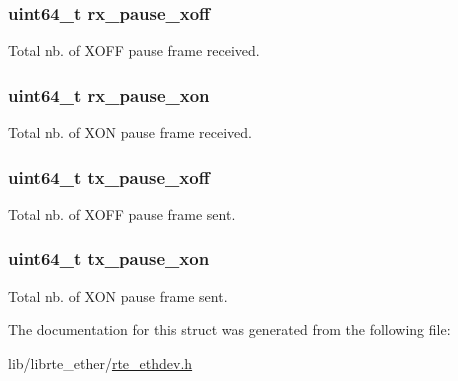 \subsubsection[{rx\+\_\+pause\+\_\+xoff}]{\setlength{\rightskip}{0pt plus 5cm}uint64\+\_\+t rx\+\_\+pause\+\_\+xoff}\label{structrte__eth__stats_ae5db296a3ba987c8543a66d92dc923e1}
Total nb. of X\+O\+F\+F pause frame received. \hypertarget{structrte__eth__stats_a426fcfeeda8b8ca5cda9bccbb96fa554}{}
\subsubsection[{rx\+\_\+pause\+\_\+xon}]{\setlength{\rightskip}{0pt plus 5cm}uint64\+\_\+t rx\+\_\+pause\+\_\+xon}\label{structrte__eth__stats_a426fcfeeda8b8ca5cda9bccbb96fa554}
Total nb. of X\+O\+N pause frame received. \hypertarget{structrte__eth__stats_a0585fd6c2b493d1a227b7a2cc9dedad3}{}
\subsubsection[{tx\+\_\+pause\+\_\+xoff}]{\setlength{\rightskip}{0pt plus 5cm}uint64\+\_\+t tx\+\_\+pause\+\_\+xoff}\label{structrte__eth__stats_a0585fd6c2b493d1a227b7a2cc9dedad3}
Total nb. of X\+O\+F\+F pause frame sent. \hypertarget{structrte__eth__stats_a9a059300921a0a35c16dbf64e8861ced}{}
\subsubsection[{tx\+\_\+pause\+\_\+xon}]{\setlength{\rightskip}{0pt plus 5cm}uint64\+\_\+t tx\+\_\+pause\+\_\+xon}\label{structrte__eth__stats_a9a059300921a0a35c16dbf64e8861ced}
Total nb. of X\+O\+N pause frame sent. 

The documentation for this struct was generated from the following file\+:\begin{DoxyCompactItemize}
\item 
lib/librte\+\_\+ether/\hyperlink{rte__ethdev_8h}{rte\+\_\+ethdev.\+h}\end{DoxyCompactItemize}
